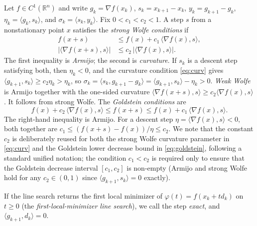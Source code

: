 \documentclass[11pt]{article}
\newcommand{\R}{\mathbb{R}}
\newcommand{\ip}[2]{\langle #1,#2\rangle}
\begin{document}
Let $f\in C^1(\R^n)$ and write $g_k=\nabla f(x_k)$, $s_k=x_{k+1}-x_k$,
$y_k=g_{k+1}-g_k$, $\eta_k=\ip{g_k}{s_k}$, and $\sigma_k=\ip{s_k}{y_k}$.
Fix $0<c_1<c_2<1$. A step $s$ from a nonstationary point $x$ satisfies
the \emph{strong Wolfe conditions} if
\begin{align}
f(x+s)&\le f(x)+c_1\,\ip{\nabla f(x)}{s}, \label{eq:armijo}\\
\bigl|\ip{\nabla f(x+s)}{s}\bigr|&\le c_2\,\bigl|\ip{\nabla f(x)}{s}\bigr|. \label{eq:curv}
\end{align}
The first inequality is \emph{Armijo}; the second is \emph{curvature}.
If $s_k$ is a descent step satisfying both, then $\eta_k<0$, and
the curvature condition \eqref{eq:curv} gives $\ip{g_{k+1}}{s_k}\ge c_2\eta_k>\eta_k$,
so $\sigma_k=\ip{s_k}{g_{k+1}-g_k}=\ip{g_{k+1}}{s_k}-\eta_k>0$. \emph{Weak Wolfe} is Armijo together with the one-sided
curvature $\ip{\nabla f(x+s)}{s}\ge c_2\ip{\nabla f(x)}{s}$. It follows
from strong Wolfe. The \emph{Goldstein conditions} are
\begin{equation}
\label{eq:goldstein}
f(x)+c_2\,\ip{\nabla f(x)}{s}
\le f(x+s)
\le f(x)+c_1\,\ip{\nabla f(x)}{s}.
\end{equation}
The right-hand inequality is Armijo. For a descent step
$\eta=\ip{\nabla f(x)}{s}<0$, both together are
$c_1\le(f(x+s)-f(x))/\eta\le c_2$.
We note that the constant $c_2$ is deliberately reused for both the strong Wolfe curvature parameter in \eqref{eq:curv} and the Goldstein lower decrease bound in \eqref{eq:goldstein}, following a standard unified notation; the condition $c_1 < c_2$ is required only to ensure that the Goldstein decrease interval $[c_1, c_2]$ is non-empty (Armijo and strong Wolfe hold for any $c_2 \in (0, 1)$ since $\ip{g_{k+1}}{s_k} = 0$ exactly).

If the line search returns the first local minimizer of
$\varphi(t)=f(x_k+td_k)$ on $t\ge0$ (the \emph{first-local-minimizer line search}), we call the step \emph{exact}, and
$\ip{g_{k+1}}{d_k}=0$.
\end{document}

